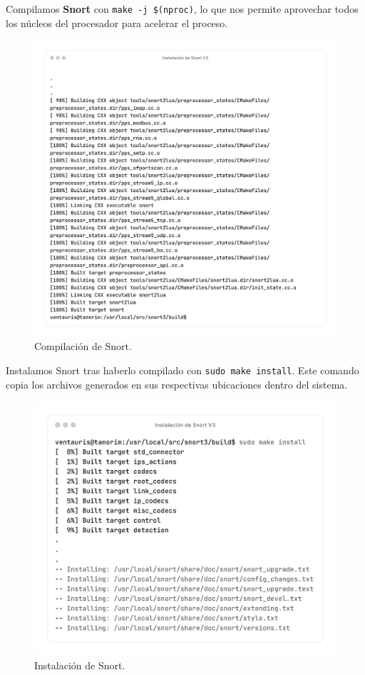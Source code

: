 \documentclass[12pt,a4paper]{report}
\begin{document}
\newpage

Compilamos \textbf{Snort} con \texttt{make -j \$(nproc)}, lo que nos permite aprovechar todos los núcleos del procesador para acelerar el proceso.

\begin{figure}[H]
	\centering
	\includegraphics[scale=0.12]{instalacion_snort/22-22.png}
	\caption{Compilación de Snort.}
\end{figure}

\newpage

Instalamos Snort tras haberlo compilado con \texttt{sudo make install}. Este comando copia los archivos generados en sus respectivas ubicaciones dentro del sistema.

\begin{figure}[H]
	\centering
	\includegraphics[scale=0.12]{instalacion_snort/23-23.png}
	\caption{Instalación de Snort.}
\end{figure}
\end{document}
